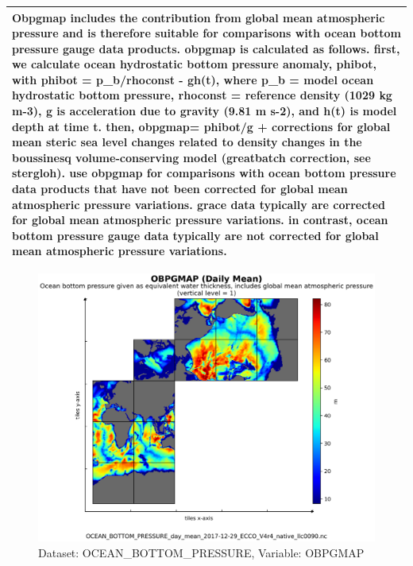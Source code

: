 \begin{longtable}{|m{}|m{}|m{}|m{}|}
\multicolumn{4}{|p{1\textwidth}|}{\footnotesize{{Obpgmap includes the contribution from global mean atmospheric pressure and is therefore suitable for comparisons with ocean bottom pressure gauge data products. obpgmap is calculated as follows. first, we calculate ocean hydrostatic bottom pressure anomaly, phibot, with phibot = p\_b/rhoconst - gh(t), where p\_b = model ocean hydrostatic bottom pressure, rhoconst = reference density (1029 kg m-3), g is acceleration due to gravity (9.81 m s-2), and h(t) is model depth at time t. then, obpgmap= phibot/g + corrections for global mean steric sea level changes related to density changes in the boussinesq volume-conserving model (greatbatch correction, see stergloh). use obpgmap for comparisons with ocean bottom pressure data products that have not been corrected for global mean atmospheric pressure variations. grace data typically are corrected for global mean atmospheric pressure variations. in contrast, ocean bottom pressure gauge data typically are not corrected for global mean atmospheric pressure variations.}}} \\ \hline
\end{longtable}

\begin{figure}[H]
\centering
\includegraphics[scale=0.55]{../images/plots/v4r4/native_plots/Ocean_Bottom_Pressure/OBPGMAP.png}
\caption{Dataset: OCEAN\_BOTTOM\_PRESSURE, Variable: OBPGMAP}
\label{tab:table-OCEAN_BOTTOM_PRESSURE_OBPGMAP-Plot}
\end{figure}
\newpage
\pagebreak
